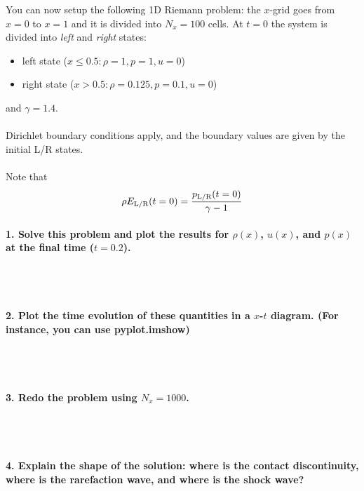 You can now setup the following 1D Riemann problem: the 
$x$-grid goes from $x=0$ to $x=1$ and it is divided into 
$N_x=100$ cells. At $t=0$ the system is divided into 
\textit{left} and \textit{right} states:
\begin{itemize}
    \item left state ($x\leq0.5: \rho=1,p=1,u=0$)
    \item right state ($x>0.5: \rho=0.125,p=0.1,u=0$)
\end{itemize}
and $\gamma=1.4$. \\
\\
Dirichlet boundary conditions apply, and 
the boundary values are given by the initial L/R states. \\
\\
Note that 
\begin{equation}
    \rho E_\textnormal{L/R}(t=0)
    =\frac{p_\textnormal{L/R}(t=0)}{\gamma-1}
\end{equation}
\newpage

\paragraph{1. Solve this problem and plot the results for 
    $\rho(x)$, $u(x)$, and $p(x)$ at the final time
    ($t=0.2$).
} \ \\
    \\

\paragraph{2. Plot the time evolution of these quantities 
    in a $x$-$t$ diagram. (For instance, you can use 
    pyplot.imshow)
} \ \\
    \\

\paragraph{3. Redo the problem using $N_x=1000$. } \ \\
    \\

\paragraph{4. Explain the shape of the solution: where is 
    the contact discontinuity, where is the rarefaction 
    wave, and where is the shock wave?
} \ \\
    \\

